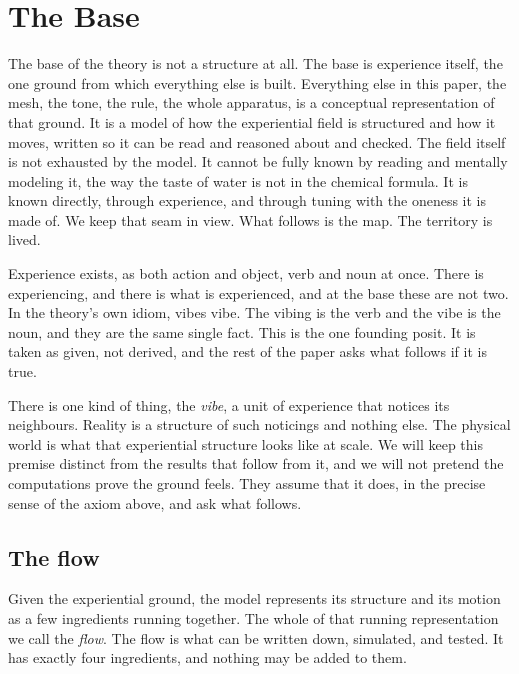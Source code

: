 \section{The Base}

The base of the theory is not a structure at all. The base is experience itself, the one ground from which
everything else is built. Everything else in this paper, the mesh, the tone, the rule, the whole apparatus, is a
conceptual representation of that ground. It is a model of how the experiential field is structured and how it
moves, written so it can be read and reasoned about and checked. The field itself is not exhausted by the model.
It cannot be fully known by reading and mentally modeling it, the way the taste of water is not in the chemical
formula. It is known directly, through experience, and through tuning with the oneness it is made of. We keep
that seam in view. What follows is the map. The territory is lived.

\begin{axiom}
Experience exists, as both action and object, verb and noun at once. There is experiencing, and there is what is
experienced, and at the base these are not two. In the theory's own idiom, vibes vibe. The vibing is the verb and
the vibe is the noun, and they are the same single fact. This is the one founding posit. It is taken as given,
not derived, and the rest of the paper asks what follows if it is true.
\end{axiom}

There is one kind of thing, the \emph{vibe}, a unit of experience that notices its neighbours. Reality is a
structure of such noticings and nothing else. The physical world is what that experiential structure looks like
at scale. We will keep this premise distinct from the results that follow from it, and we will not pretend the
computations prove the ground feels. They assume that it does, in the precise sense of the axiom above, and ask
what follows.

\subsection{The flow}

Given the experiential ground, the model represents its structure and its motion as a few ingredients running
together. The whole of that running representation we call the \emph{flow}. The flow is what can be written down,
simulated, and tested. It has exactly four ingredients, and nothing may be added to them.

